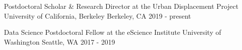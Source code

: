 

\begin{cventries}

  \cventry
    {Postdoctoral Scholar \& Research Director at the Urban Displacement Project} %
    {University of California, Berkeley} %
    {Berkeley, CA} %
    {2019 - present} %
    {
    }

  \cventry
    {Data Science Postdoctoral Fellow at the eScience Institute} %
    {University of Washington} %
    {Seattle, WA} %
    {2017 - 2019} %
    {
    }


\end{cventries}
